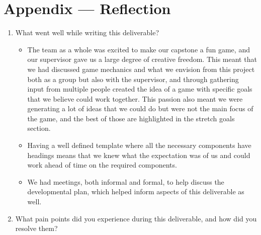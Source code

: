\documentclass{article}
\begin{document}
\section*{Appendix --- Reflection}


%

\begin{enumerate}
    \item What went well while writing this deliverable?\\
    
	\begin{itemize}
		\item The team as a whole was excited to make our capstone a fun game, and our supervisor gave us a large degree of creative freedom. This meant that we had discussed game mechanics and what we envision from this project both as a group but also with the supervisor, and through gathering input from multiple people created the idea of a game with specific goals that we believe could work together. This passion also meant we were generating a lot of ideas that we could do but were not the main focus of the game, and the best of those are highlighted in the stretch goals section.
		\item Having a well defined template where all the necessary components have headings means that we knew what the expectation was of us and could work ahead of time on the required components.
		\item We had meetings, both informal and formal, to help discuss the developmental plan, which helped inform aspects of this deliverable as well.
	\end{itemize}
    
    \item What pain points did you experience during this deliverable, and how
    did you resolve them?
    

\end{enumerate}
\end{document}
